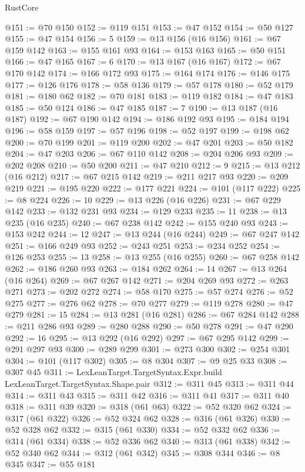 \begin{lexlean}{RustCore}
\begin{coremodule}
@151 := @70 @150
@152 := @119 @151
@153 := @47 @152
@154 := @50 @127
@155 := @47 @154
@156 := 5
@159 := @13 @156 (@16 @156)
@161 := @67 @159 @142
@163 := @155 @161 @93
@164 := @153 @163
@165 := @50 @151
@166 := @47 @165
@167 := 6
@170 := @13 @167 (@16 @167)
@172 := @67 @170 @142
@174 := @166 @172 @93
@175 := @164 @174
@176 := @146 @175
@177 := @126 @176
@178 := @58 @136
@179 := @57 @178
@180 := @52 @179
@181 := @180 @62
@182 := @70 @181
@183 := @119 @182
@184 := @47 @183
@185 := @50 @124
@186 := @47 @185
@187 := 7
@190 := @13 @187 (@16 @187)
@192 := @67 @190 @142
@194 := @186 @192 @93
@195 := @184 @194
@196 := @58 @159
@197 := @57 @196
@198 := @52 @197
@199 := @198 @62
@200 := @70 @199
@201 := @119 @200
@202 := @47 @201
@203 := @50 @182
@204 := @47 @203
@206 := @67 @110 @142
@208 := @204 @206 @93
@209 := @202 @208
@210 := @50 @200
@211 := @47 @210
@212 := 9
@215 := @13 @212 (@16 @212)
@217 := @67 @215 @142
@219 := @211 @217 @93
@220 := @209 @219
@221 := @195 @220
@222 := @177 @221
@224 := @101 (@117 @222)
@225 := @8 @224
@226 := 10
@229 := @13 @226 (@16 @226)
@231 := @67 @229 @142
@233 := @132 @231 @93
@234 := @129 @233
@235 := 11
@238 := @13 @235 (@16 @235)
@240 := @67 @238 @142
@242 := @155 @240 @93
@243 := @153 @242
@244 := 12
@247 := @13 @244 (@16 @244)
@249 := @67 @247 @142
@251 := @166 @249 @93
@252 := @243 @251
@253 := @234 @252
@254 := @126 @253
@255 := 13
@258 := @13 @255 (@16 @255)
@260 := @67 @258 @142
@262 := @186 @260 @93
@263 := @184 @262
@264 := 14
@267 := @13 @264 (@16 @264)
@269 := @67 @267 @142
@271 := @204 @269 @93
@272 := @263 @271
@273 := @202 @272
@274 := @58 @170
@275 := @57 @274
@276 := @52 @275
@277 := @276 @62
@278 := @70 @277
@279 := @119 @278
@280 := @47 @279
@281 := 15
@284 := @13 @281 (@16 @281)
@286 := @67 @284 @142
@288 := @211 @286 @93
@289 := @280 @288
@290 := @50 @278
@291 := @47 @290
@292 := 16
@295 := @13 @292 (@16 @292)
@297 := @67 @295 @142
@299 := @291 @297 @93
@300 := @289 @299
@301 := @273 @300
@302 := @254 @301
@304 := @101 (@117 @302)
@305 := @8 @304
@307 := @9 @25 @33
@308 := @307 @45
@311 := LexLeanTarget.TargetSyntax.Expr.build LexLeanTarget.TargetSyntax.Shape.pair
@312 := @311 @45
@313 := @311 @44
@314 := @311 @43
@315 := @311 @42
@316 := @311 @41
@317 := @311 @40
@318 := @311 @39
@320 := @318 (@61 @63)
@322 := @52 @320 @62
@324 := @317 (@61 @322)
@326 := @52 @324 @62
@328 := @316 (@61 @326)
@330 := @52 @328 @62
@332 := @315 (@61 @330)
@334 := @52 @332 @62
@336 := @314 (@61 @334)
@338 := @52 @336 @62
@340 := @313 (@61 @338)
@342 := @52 @340 @62
@344 := @312 (@61 @342)
@345 := @308 @344
@346 := @8 @345
@347 := @55 @181

\end{coremodule}
\end{lexlean}
